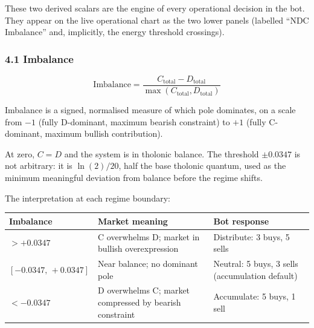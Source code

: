 \documentclass[
  11pt,
  letterpaper,
]{article}
\begin{document}
These two derived scalars are the engine of every operational decision
in the bot. They appear on the live operational chart as the two lower
panels (labelled ``NDC Imbalance'' and, implicitly, the energy threshold
crossings).

\subsubsection{4.1 Imbalance}\label{imbalance}

\[\text{Imbalance} = \frac{C_{\text{total}} - D_{\text{total}}}{\max(C_{\text{total}}, D_{\text{total}})}\]

Imbalance is a signed, normalised measure of which pole dominates, on a
scale from \(-1\) (fully D-dominant, maximum bearish constraint) to
\(+1\) (fully C-dominant, maximum bullish contribution).

At zero, \(C = D\) and the system is in tholonic balance. The threshold
\(\pm 0.0347\) is not arbitrary: it is \(\ln(2)/20\), half the base
tholonic quantum, used as the minimum meaningful deviation from balance
before the regime shifts.

The interpretation at each regime boundary:

\begin{longtable}[]{@{}
  >{\raggedright\arraybackslash}p{}
  >{\raggedright\arraybackslash}p{}
  >{\raggedright\arraybackslash}p{}@{}}
\toprule\noalign{}
\begin{minipage}[b]{\linewidth}\raggedright
Imbalance
\end{minipage} & \begin{minipage}[b]{\linewidth}\raggedright
Market meaning
\end{minipage} & \begin{minipage}[b]{\linewidth}\raggedright
Bot response
\end{minipage} \\
\midrule\noalign{}
\endhead
\bottomrule\noalign{}
\endlastfoot
\(> +0.0347\) & C overwhelms D; market in bullish overexpression &
Distribute: 3 buys, 5 sells \\
\([-0.0347,\, +0.0347]\) & Near balance; no dominant pole & Neutral: 5
buys, 3 sells (accumulation default) \\
\(< -0.0347\) & D overwhelms C; market compressed by bearish constraint
& Accumulate: 5 buys, 1 sell \\
\end{longtable}
\end{document}
